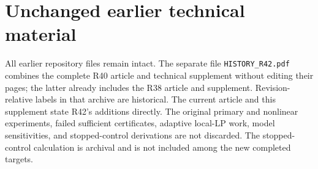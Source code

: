 \section{Unchanged earlier technical material}
All earlier repository files remain intact. The separate file \texttt{HISTORY\_R42.pdf} combines the complete R40 article and technical supplement without editing their pages; the latter already includes the R38 article and supplement. Revision-relative labels in that archive are historical. The current article and this supplement state R42's additions directly. The original primary and nonlinear experiments, failed sufficient certificates, adaptive local-LP work, model sensitivities, and stopped-control derivations are not discarded. The stopped-control calculation is archival and is not included among the new completed targets.

